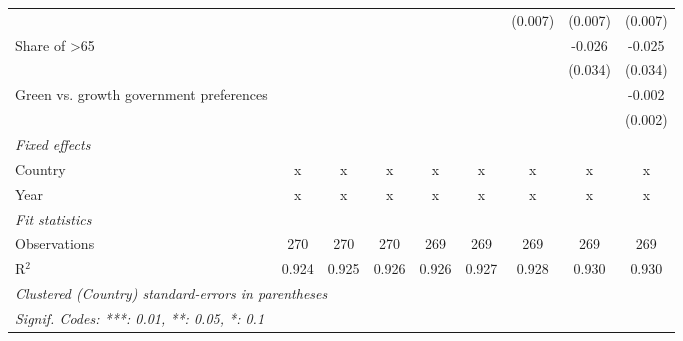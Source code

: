 \begin{table}[htbp]
\begin{tabular}{lcccccccc}
                                                   &         &         &         &         &         & (0.007) & (0.007) & (0.007)\\   
      Share of >65                                 &         &         &         &         &         &         & -0.026  & -0.025\\   
                                                   &         &         &         &         &         &         & (0.034) & (0.034)\\   
      Green vs. growth government preferences      &         &         &         &         &         &         &         & -0.002\\   
                                                   &         &         &         &         &         &         &         & (0.002)\\   
      \emph{Fixed effects}\\
      Country                                      & x       & x       & x       & x       & x       & x       & x       & x\\  
      Year                                         & x       & x       & x       & x       & x       & x       & x       & x\\  
      \midrule \emph{Fit statistics}\\
      Observations                                 & 270     & 270     & 270     & 269     & 269     & 269     & 269     & 269\\  
      R$^2$                                        & 0.924   & 0.925   & 0.926   & 0.926   & 0.927   & 0.928   & 0.930   & 0.930\\  
      \midrule
      \multicolumn{9}{l}{\emph{Clustered (Country) standard-errors in parentheses}}\\
      \multicolumn{9}{l}{\emph{Signif. Codes: ***: 0.01, **: 0.05, *: 0.1}}\\
   \end{tabular}
\end{table}


